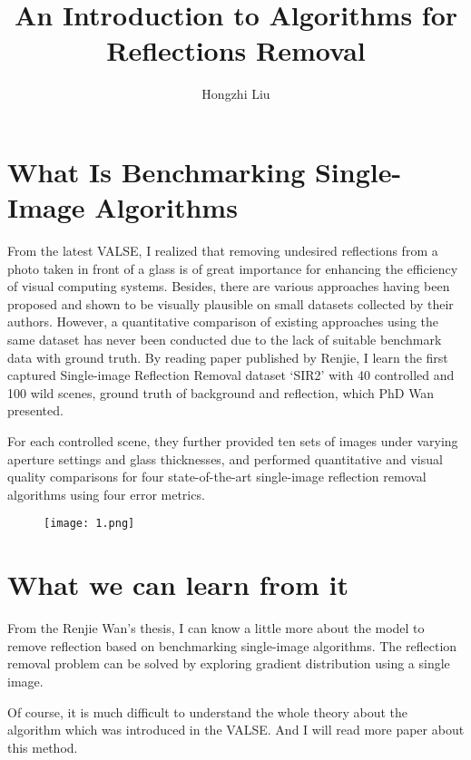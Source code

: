 \documentclass{article}
\author{Hongzhi Liu}
\title{An Introduction to Algorithms for Reflections Removal}
\begin{document}
  \maketitle
  \section{What Is Benchmarking Single-Image Algorithms}
  \par
  From the latest VALSE, I realized that removing undesired reflections from a photo taken in front of a glass is of great importance for enhancing the efficiency of visual computing systems. Besides, there are various approaches having been proposed and shown to be visually plausible on small datasets collected by their authors. However, a quantitative comparison of existing approaches using the same dataset has never been conducted due to the lack of suitable benchmark data with ground truth. By reading paper published by Renjie, I learn the first captured Single-image Reflection Removal dataset `SIR2' with 40 controlled and 100 wild scenes, ground truth of background and reflection, which PhD Wan presented.

  For each controlled scene, they further provided ten sets of images under varying aperture settings and glass thicknesses, and performed quantitative and visual quality comparisons for four state-of-the-art single-image reflection removal algorithms using four error metrics.
\begin{figure}[ht]
\centering
\texttt{[image: 1.png]}
\end{figure}

  \section{What we can learn from it}
  \par
  From the Renjie Wan's thesis, I can know a little more about the model to remove reflection based on benchmarking single-image algorithms. The reflection removal problem can be solved by exploring gradient distribution using a single image.

  Of course, it is much difficult to understand the whole theory about the algorithm which was introduced in the VALSE. And I will read more paper about this method.
\end{document}
